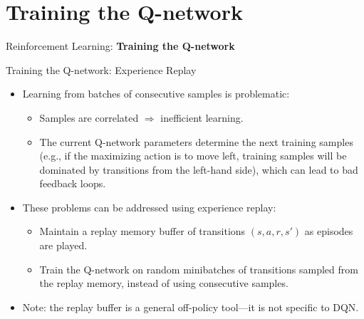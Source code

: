 \section{Training the Q-network}
\begin{frame}{}
    \LARGE Reinforcement Learning: \textbf{Training the Q-network}
\end{frame}

\begin{frame}{Training the Q-network: Experience Replay}
    \begin{itemize}
        \item Learning from batches of consecutive samples is problematic:
        \begin{itemize}
            \item Samples are correlated $\Rightarrow$ inefficient learning.
            \item The current Q-network parameters determine the next training samples (e.g., if the maximizing action is to move left, training samples will be dominated by transitions from the left-hand side), which can lead to bad feedback loops.
        \end{itemize}
        \pause
        \item These problems can be addressed using experience replay:
        \begin{itemize}
            \item Maintain a replay memory buffer of transitions $(s, a, r, s')$ as episodes are played.
            \item Train the Q-network on random minibatches of transitions sampled from the replay memory, instead of using consecutive samples.
        \end{itemize}
        \item Note: the replay buffer is a general off-policy tool---it is not specific to DQN.
    \end{itemize}
\end{frame}